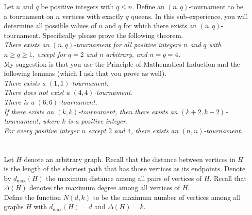 \documentclass{article}
\begin{document}
  Let $n$ and $q$ be positive integers with $q \leq n$.  Define an $(n,q)$-tournament to be a tournament on $n$ vertices with exactly $q$ queens.  In this sub-experience, you will determine all possible values of $n$ and $q$ for which there exists an $(n,q)$-tournament.  Specifically please prove the following theorem.\\ 
  \emph{There exists an $(n,q)$-tournament for all positive integers $n$ and $q$ with $n \geq q \geq 1$, except for $q =2$ and $n$ arbitrary, and $n=q =4$.}\\
\noindent My suggestion is that you use the Principle of Mathematical Induction and the following lemmas (which I ask that you prove as well).\\
 \emph{There exists a $(1,1)$-tournament.}\\
 \emph{There does not exist a $(4,4)$-tournament.}\\
 \emph{There is a $(6,6)$-tournament.}\\
 \emph{If there exists an $(k,k)$-tournament, then there exists an $(k+2, k+2)$-tournament, where $k$ is a positive integer.}\\
 \emph{For every positive integer $n$ except $2$ and $4$, there exists an $(n,n)$-tournament.} \\[2em]
\noindent \underline{\hspace{5in}}\\[2em]
\noindent \maltese \hspace{1ex}{\bf Sub-Experience Two: An Optimization Problem}\\
\vspace{2em}
\noindent Let $H$ denote an arbitrary graph.  Recall that the distance between vertices in $H$ is the length of the shortest path that has those vertices as its endpoints.  Denote by $d_{\mathrm{max}}(H)$ the maximum distance among all pairs of vertices of $H$.  Recall that $\Delta(H)$ denotes the maximum degree among all vertices of $H$.\\
\noindent Define the function $N(d,k)$ to be the maximum number of vertices among all graphs $H$ with $d_{\mathrm{max}}(H) = d$ and $\Delta(H) = k$.\\
\end{document}
